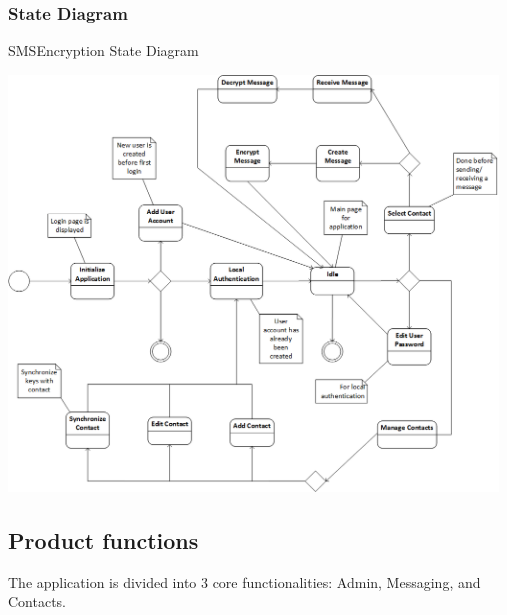 \subsubsection{State Diagram}
SMSEncryption State Diagram

\begin{center}
 \includegraphics[width=13cm]{diagrams/StateDiagrams/SMSEncryptionStateMachine.png}
\end{center}


\subsection{Product functions}
The application is divided into 3 core functionalities: Admin, Messaging, and Contacts.

